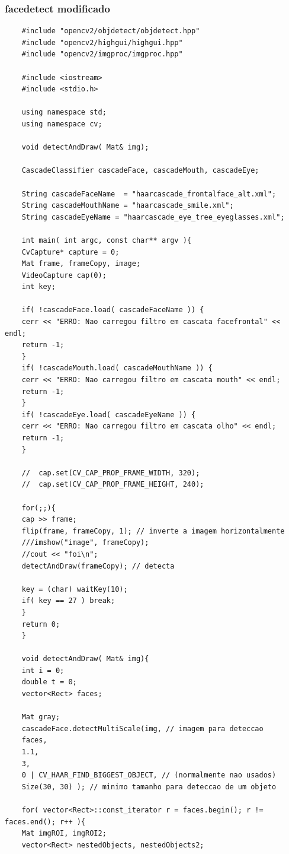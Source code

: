 \documentclass{article}
\begin{document}
	\subsubsection{facedetect modificado}
	\begin{lstlisting}
	#include "opencv2/objdetect/objdetect.hpp"
	#include "opencv2/highgui/highgui.hpp"
	#include "opencv2/imgproc/imgproc.hpp"
	
	#include <iostream>
	#include <stdio.h>
	
	using namespace std;
	using namespace cv;
	
	void detectAndDraw( Mat& img);
	
	CascadeClassifier cascadeFace, cascadeMouth, cascadeEye;
	
	String cascadeFaceName  = "haarcascade_frontalface_alt.xml";
	String cascadeMouthName = "haarcascade_smile.xml";
	String cascadeEyeName = "haarcascade_eye_tree_eyeglasses.xml";
	
	int main( int argc, const char** argv ){
	CvCapture* capture = 0;
	Mat frame, frameCopy, image;
	VideoCapture cap(0);
	int key;
	
	if( !cascadeFace.load( cascadeFaceName )) {
	cerr << "ERRO: Nao carregou filtro em cascata facefrontal" << endl;
	return -1;
	}
	if( !cascadeMouth.load( cascadeMouthName )) {
	cerr << "ERRO: Nao carregou filtro em cascata mouth" << endl;
	return -1;
	}
	if( !cascadeEye.load( cascadeEyeName )) {
	cerr << "ERRO: Nao carregou filtro em cascata olho" << endl;
	return -1;
	}
	
	//  cap.set(CV_CAP_PROP_FRAME_WIDTH, 320);
	//  cap.set(CV_CAP_PROP_FRAME_HEIGHT, 240);
	
	for(;;){
	cap >> frame;
	flip(frame, frameCopy, 1); // inverte a imagem horizontalmente
	///imshow("image", frameCopy);
	//cout << "foi\n";
	detectAndDraw(frameCopy); // detecta 
	
	key = (char) waitKey(10);
	if( key == 27 ) break;
	}  
	return 0;
	}
	
	void detectAndDraw( Mat& img){
	int i = 0;
	double t = 0;
	vector<Rect> faces;
	
	Mat gray;
	cascadeFace.detectMultiScale(img, // imagem para deteccao
	faces, 
	1.1, 
	3, 
	0 | CV_HAAR_FIND_BIGGEST_OBJECT, // (normalmente nao usados)
	Size(30, 30) ); // minimo tamanho para deteccao de um objeto
	
	for( vector<Rect>::const_iterator r = faces.begin(); r != faces.end(); r++ ){
	Mat imgROI, imgROI2;
	vector<Rect> nestedObjects, nestedObjects2;
	

\end{lstlisting}
\end{document}

